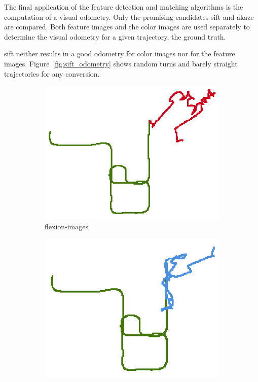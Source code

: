 The final application of the feature detection and matching algorithms is the computation of a visual odometry.
Only the promising candidates \acrshort{sift} and \acrshort{akaze} are compared.
Both feature images and the color images are used separately to determine the visual odometry for a given trajectory, the ground truth.

\acrshort{sift} neither results in a good odometry for color images nor for the feature images.
Figure~\ref{fig:sift_odometry} shows random turns and barely straight trajectories for any conversion.
\begin{figure}[t]
\begin{subfigure}[b]{0.31\linewidth}
    \includegraphics[width=\linewidth]{chapter06/odo/jonas_flexion_SIFT_nice.png}%
    \caption{\glspl{flexion-image}}
\end{subfigure}%
\begin{subfigure}[b]{0.31\linewidth}
    \includegraphics[width=\linewidth]{chapter06/odo/jonas_bearing_SIFT_nice.png}%

\end{subfigure}
\end{figure}
